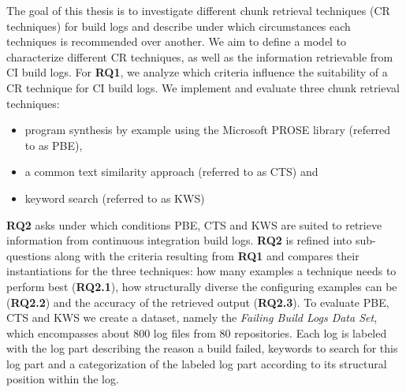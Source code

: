 \documentclass[\myrootdir/main.tex]{subfiles}
\begin{document}
The goal of this thesis is to investigate different chunk retrieval techniques (CR techniques) for build logs and describe under which circumstances each techniques is recommended over another.
We aim to define a model to characterize different CR techniques, as well as the information retrievable from CI build logs.
For \textbf{RQ1}, we analyze which criteria influence the suitability of a CR technique for CI build logs.
We implement and evaluate three chunk retrieval techniques:
\begin{itemize}
  \item program synthesis by example using the Microsoft PROSE library (referred to as PBE),
  \item a common text similarity approach (referred to as CTS) and
  \item keyword search (referred to as KWS)
\end{itemize}
\textbf{RQ2} asks under which conditions PBE, CTS and KWS are suited to retrieve information from continuous integration build logs.
\textbf{RQ2} is refined into sub-questions along with the criteria resulting from \textbf{RQ1} and compares their instantiations for the three techniques:
how many examples a technique needs to perform best (\textbf{RQ2.1}), how structurally diverse the configuring examples can be (\textbf{RQ2.2}) and the accuracy of the retrieved output (\textbf{RQ2.3}).
To evaluate PBE, CTS and KWS we create a dataset, namely the \emph{Failing Build Logs Data Set}, which encompasses about 800 log files from 80 repositories.
Each log is labeled with the log part describing the reason a build failed, keywords to search for this log part and a categorization of the labeled log part according to its structural position within the log.
\end{document}
